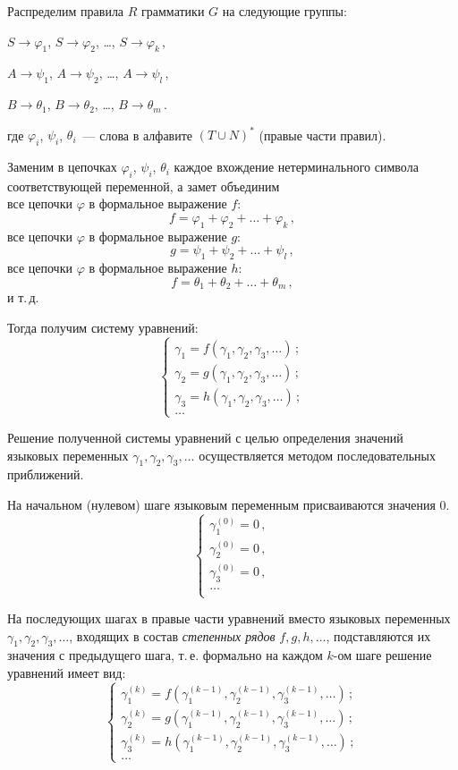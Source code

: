 Распределим правила $R$ грамматики $G$ на следующие группы:
\begin{list}{)}{}
\item $S \to \varphi_1$, $S \to \varphi_2$, \ldots, $S \to \varphi_k$\,,
\item $A \to \psi_1$, $A \to \psi_2$, \ldots, $A \to \psi_l$\,,
\item $B \to \theta_1$, $B \to \theta_2$, \ldots, $B \to \theta_m$\,.
\end{list}
где $\varphi_i$, $\psi_i$, $\theta_i$~--- слова в алфавите $(T \cup
N)^*$ (правые части правил).

Заменим в цепочках $\varphi_i$, $\psi_i$, $\theta_i$ каждое вхождение
нетерминального символа соответствующей переменной, а замет объединим\\
все цепочки $\varphi$ в формальное выражение $f$:
$$f = \varphi_1 + \varphi_2 + \ldots + \varphi_k\,,$$
все цепочки $\varphi$ в формальное выражение $g$:
$$g = \psi_1 + \psi_2 + \ldots + \psi_l\,,$$
все цепочки $\varphi$ в формальное выражение $h$:
$$f = \theta_1 + \theta_2 + \ldots + \theta_m\,,$$
и т.\,д.

Тогда получим систему уравнений:
$$
\begin{cases}
  \gamma_1 = f(\gamma_1, \gamma_2, \gamma_3, \ldots)\,;\\
  \gamma_2 = g(\gamma_1, \gamma_2, \gamma_3, \ldots)\,;\\
  \gamma_3 = h(\gamma_1, \gamma_2, \gamma_3, \ldots)\,;\\
  \ldots
\end{cases}
$$

Решение полученной системы уравнений с целью определения значений
языковых переменных $\gamma_1, \gamma_2, \gamma_3, \ldots$
осуществляется методом последовательных приближений.

На начальном (нулевом) шаге языковым переменным присваиваются значения
$0$.
$$
\begin{cases}
  \gamma_1^{(0)} = 0\,,\\
  \gamma_2^{(0)} = 0\,,\\
  \gamma_3^{(0)} = 0\,,\\
  \ldots\\
\end{cases}
$$

На последующих шагах в правые части уравнений вместо языковых
переменных $\gamma_1, \gamma_2, \gamma_3, \ldots$, входящих в состав
\emph{степенных рядов} $f, g, h, \ldots$, подставляются их значения с
предыдущего шага, т.\,е. формально на каждом $k$-ом шаге решение
уравнений имеет вид:
$$
\begin{cases}
  \gamma_1^{(k)} = f(\gamma_1^{(k-1)}, \gamma_2^{(k-1)},
  \gamma_3^{(k-1)}, \ldots)\,;\\
  \gamma_2^{(k)} = g(\gamma_1^{(k-1)}, \gamma_2^{(k-1)},
  \gamma_3^{(k-1)}, \ldots)\,;\\ 
  \gamma_3^{(k)} = h(\gamma_1^{(k-1)}, \gamma_2^{(k-1)},
  \gamma_3^{(k-1)}, \ldots)\,;\\ 
  \ldots
\end{cases}
$$

